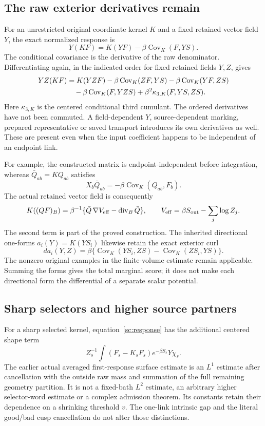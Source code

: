 \documentclass[11pt]{article}
\theoremstyle{definition}\newtheorem{definition}[theorem]{Definition}
\theoremstyle{remark}\newtheorem{remark}[theorem]{Remark}
\newcommand{\Cov}{\operatorname{Cov}}\newcommand{\Tr}{\operatorname{Tr}}
\providecommand{\diver}{\operatorname{div}}
\begin{document}
\subsection{The raw exterior derivatives remain}

For an unrestricted original coordinate kernel \(K\) and a fixed retained vector field \(Y\), the exact normalized response is
\begin{equation}
 Y(KF)=K(YF)-\beta\Cov_K(F,YS).
 \label{sc:response}
\end{equation}
The conditional covariance is the derivative of the raw denominator. Differentiating again, in the indicated order for fixed retained fields \(Y,Z\), gives
\begin{align}
 YZ(KF)
 &=K(YZF)-\beta\Cov_K(ZF,YS)
             -\beta\Cov_K(YF,ZS)\notag\\
 &\quad-\beta\Cov_K(F,YZS)
          +\beta^2\kappa_{3,K}(F,YS,ZS).
 \label{sc:secondresponse}
\end{align}
Here \(\kappa_{3,K}\) is the centered conditional third cumulant. The ordered derivatives have not been commuted. A field-dependent \(Y\), source-dependent marking, prepared representative or saved transport introduces its own derivatives as well. These are present even when the input coefficient happens to be independent of an endpoint link.

For example, the constructed matrix is endpoint-independent before integration, whereas \(\bar Q_{ab}=KQ_{ab}\) satisfies
\[
 X_b\bar Q_{ab}=-\beta\Cov_K(Q_{ab},F_b).
\]
The actual retained vector field is consequently
\[
 K((QF)_B)=\beta^{-1}
             \{\bar Q\,\nabla V_{\rm eff}-\diver_B\bar Q\},
 \qquad V_{\rm eff}=\beta S_{\rm out}-\sum_j\log Z_j .
\]
The second term is part of the proved construction. The inherited directional one-forms \(a_i(Y)=K(YS_i)\) likewise retain the exact exterior curl
\[
 da_i(Y,Z)=\beta\{\Cov_K(YS_i,ZS)-\Cov_K(ZS_i,YS)\}.
\]
The nonzero original examples in the finite-volume estimate remain applicable. Summing the forms gives the total marginal score; it does not make each directional form the differential of a separate scalar potential.

\subsection{Sharp selectors and higher source partners}

For a sharp selected kernel, equation~\eqref{sc:response} has the additional centered shape term
\[
 Z_s^{-1}\int(F_s-K_sF_s)e^{-\beta S_s}Y\chi_s .
\]
The earlier actual averaged first-response surface estimate is an \(L^1\) estimate after cancellation with the outside raw mass and summation of the full remaining geometry partition. It is not a fixed-bath \(L^2\) estimate, an arbitrary higher selector-word estimate or a complex admission theorem. Its constants retain their dependence on a shrinking threshold \(v\). The one-link intrinsic gap and the literal good/bad cusp cancellation do not alter those distinctions.
\end{document}
